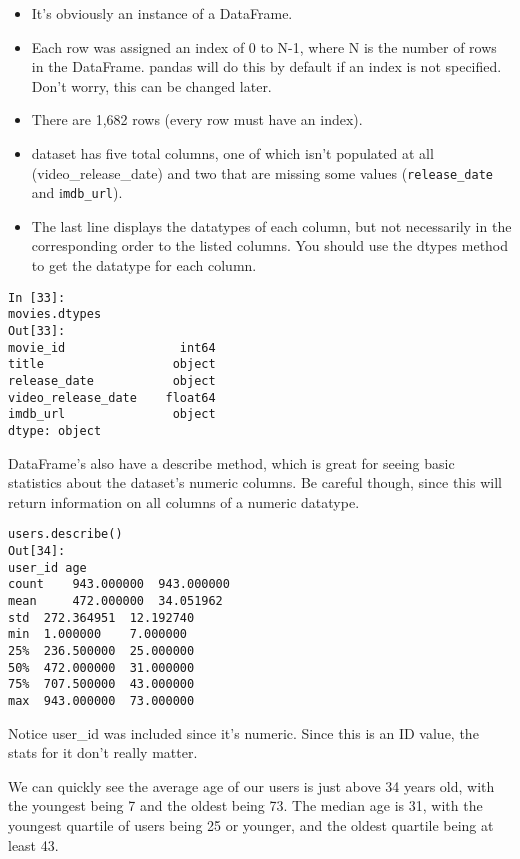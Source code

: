 \documentclass[]{article}
\begin{document}
\begin{itemize}
\item It's obviously an instance of a DataFrame.
\item Each row was assigned an index of 0 to N-1, where N is the number of rows in the DataFrame. pandas will do this by default if an index is not specified. Don't worry, this can be changed later.
\item There are 1,682 rows (every row must have an index).
\item  dataset has five total columns, one of which isn't populated at all (video\_release\_date) and two that are missing some values (\texttt{release\_date} and i\texttt{mdb\_url}).
\item The last line displays the datatypes of each column, but not necessarily in the corresponding order to the listed columns. You should use the dtypes method to get the datatype for each column.
\end{itemize}
\begin{framed}
\begin{verbatim}
In [33]:
movies.dtypes
Out[33]:
movie_id                int64
title                  object
release_date           object
video_release_date    float64
imdb_url               object
dtype: object
\end{verbatim}
\end{framed}
DataFrame's also have a describe method, which is great for seeing basic statistics about the dataset's numeric columns. Be careful though, since this will return information on all columns of a numeric datatype.

\begin{verbatim}
users.describe()
Out[34]:
user_id	age
count	 943.000000	 943.000000
mean	 472.000000	 34.051962
std	 272.364951	 12.192740
min	 1.000000	 7.000000
25%	 236.500000	 25.000000
50%	 472.000000	 31.000000
75%	 707.500000	 43.000000
max	 943.000000	 73.000000
\end{verbatim}
Notice user\_id was included since it's numeric. Since this is an ID value, the stats for it don't really matter.

We can quickly see the average age of our users is just above 34 years old, with the youngest being 7 and the oldest being 73. The median age is 31, with the youngest quartile of users being 25 or younger, and the oldest quartile being at least 43.
\end{document}
